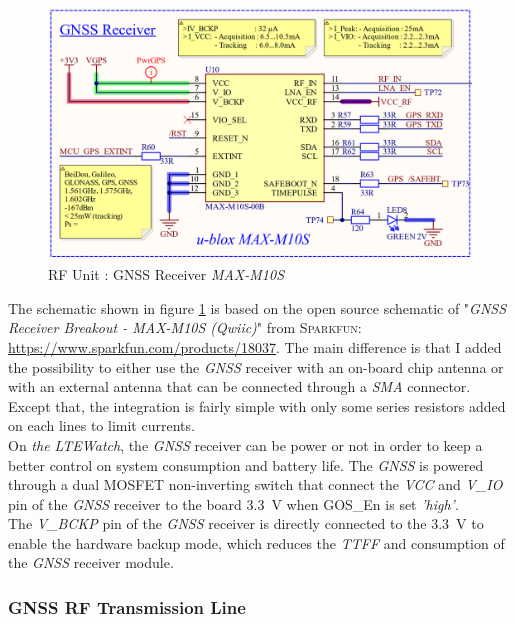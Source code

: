 \documentclass[report.tex]{subfiles}
\begin{document}
\begin{figure}[H]
	\centering
	\includegraphics[width=1\textwidth]{Include/Figure/Hardware/LTEWatch_LTEW_RF_Unit_GNSS_Receiver}
	\caption{RF Unit : GNSS Receiver \textit{MAX-M10S}}
	\label{fig:LTEWatch_LTEW_RF_Unit_GNSS_Receiver}
\end{figure}

The schematic shown in figure \ref{fig:LTEWatch_LTEW_RF_Unit_GNSS_Receiver} is based on the open source schematic of "\textit{GNSS Receiver Breakout - MAX-M10S (Qwiic)}" from \textsc{Sparkfun}: \url{https://www.sparkfun.com/products/18037}. The main difference is that I added the possibility to either use the \textit{GNSS} receiver with an on-board chip antenna or with an external antenna that can be connected through a \textit{SMA} connector. Except that, the integration is fairly simple with only some series resistors added on each lines to limit currents.\\

On \textit{the LTEWatch}, the \textit{GNSS} receiver can be power or not in order to keep a better control on system consumption and battery life. The \textit{GNSS} is powered through a dual MOSFET non-inverting switch that connect the \textit{VCC} and \textit{V\_IO} pin of the \textit{GNSS} receiver to the board \SI{3.3}{\volt} when GOS\_En is set \textit{'high'}.\\

The \textit{V\_BCKP} pin of the \textit{GNSS} receiver is directly connected to the \SI{3.3}{\volt} to enable the hardware backup mode, which reduces the \textit{TTFF} and consumption of the \textit{GNSS} receiver module.

\pagebreak
\subsubsection{GNSS RF Transmission Line}
\end{document}
